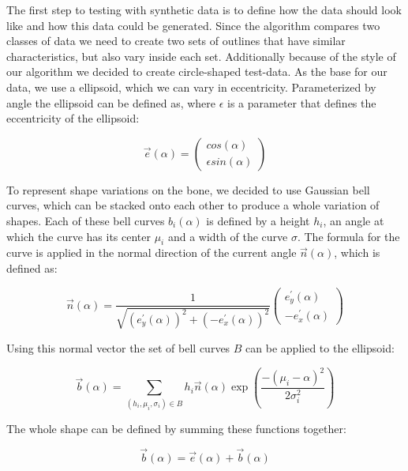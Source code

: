 \documentclass[pdftex,12pt,a4paper]{report}
\begin{document}
The first step to testing with synthetic data is to define how the data should look like and how this data could be generated. Since the algorithm compares two classes of data we need to create two sets of outlines that have similar characteristics, but also vary inside each set. Additionally because of the style of our algorithm we decided to create circle-shaped test-data. As the base for our data, we use a ellipsoid, which we can vary in eccentricity. Parameterized by angle the ellipsoid can be defined as, where $\epsilon$ is a parameter that defines the eccentricity of the ellipsoid:

\begin{equation}
	\vec{e}(\alpha) = \left( \begin{array}{c}
		cos(\alpha) \\
		\epsilon sin(\alpha)
	\end{array} \right) 
\end{equation}

To represent shape variations on the bone, we decided to use Gaussian bell curves, which can be stacked onto each other to produce a whole variation of shapes. Each of these bell curves $b_i(\alpha)$ is defined by a height $h_i$, an angle at which the curve has its center $\mu_i$ and a width of the curve $\sigma$. The formula for the curve is applied in the normal direction of the current angle $\vec{n}(\alpha)$, which is defined as:

\begin{equation}
	\vec{n}(\alpha) = \frac{1}{\sqrt{(e_y^\prime(\alpha))^2 + (-e_x^\prime(\alpha))^2}}\left( \begin{array}{c}
		e_y^\prime(\alpha) \\
		-e_x^\prime(\alpha)
	\end{array} \right)
\end{equation}

Using this normal vector the set of bell curves $B$ can be applied to the ellipsoid:

\begin{equation}
	\vec{b}(\alpha) = \sum_{(h_i, \mu_i, \sigma_i) \in B}h_i \vec{n}(\alpha) \exp\left(\frac{-(\mu_i - \alpha)^2}{2 \sigma_i^2} \right )
\end{equation}

The whole shape can be defined by summing these functions together:

\begin{equation}
	\vec{b}(\alpha) = \vec{e}(\alpha) + \vec{b}(\alpha)
\end{equation}
\end{document}
